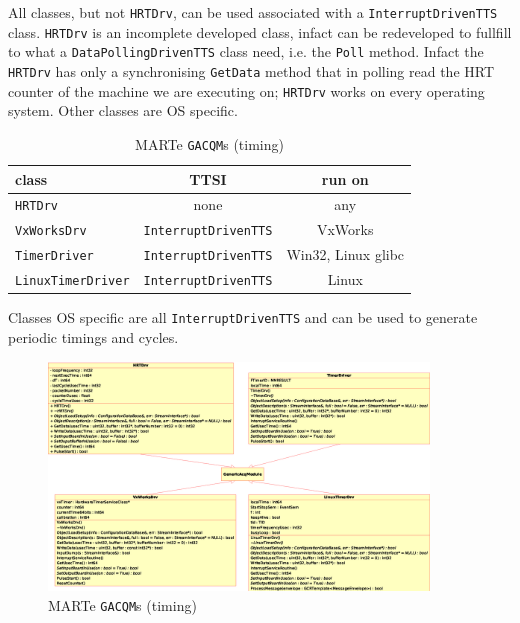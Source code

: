 All classes, but not \texttt{HRTDrv}, can be used associated with a \texttt{InterruptDrivenTTS} class. \texttt{HRTDrv} is an incomplete developed class, infact can be redeveloped to fullfill to what a \texttt{DataPollingDrivenTTS} class need, i.e. the \texttt{Poll} method. Infact the \texttt{HRTDrv} has only a synchronising \texttt{GetData} method that in polling read the HRT counter of the machine we are executing on; \texttt{HRTDrv} works on every operating system. Other classes are OS specific. \\

\begin{table}[!h]
 \begin{center}
  \begin{tabular}{|l|c|c|}
   \hline
    \textbf{class} & \textbf{TTSI} & \textbf{run on} \\
   \hline
\texttt{HRTDrv} & none & any \\
\texttt{VxWorksDrv} & \texttt{InterruptDrivenTTS} & VxWorks \\
\texttt{TimerDriver} & \texttt{InterruptDrivenTTS} & Win32, Linux glibc \\
\texttt{LinuxTimerDriver} & \texttt{InterruptDrivenTTS} & Linux \\ 
   \hline
   \end{tabular}
   \end{center}
  \caption{MARTe \texttt{GACQM}s (timing)}
 \label{t:MARTe_Timing}
\end{table}

Classes OS specific are all \texttt{InterruptDrivenTTS} and can be used to generate periodic timings and cycles. \\

\begin{figure}[h!]
 \begin{center}
  \includegraphics[width=0.9\textwidth]{MARTe/IOGAMs-Drv-Timing.eps}
  \caption{MARTe \texttt{GACQM}s (timing)}
  \label{f:MARTe:IOGAMs_Timing}
 \end{center}
\end{figure}

